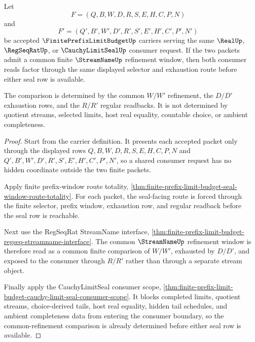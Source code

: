 \begin{theorem}
\label{thm:finite-prefix-limit-budget-common-refinement-determinacy}
Let
$$
F=(Q,B,W,D,R,S,E,H,C,P,N)
$$
and
$$
F'=(Q',B',W',D',R',S',E',H',C',P',N')
$$
be accepted $\FinitePrefixLimitBudgetUp$ carriers serving the same $\RealUp$, $\RegSeqRatUp$, or $\CauchyLimitSealUp$ consumer request. If the two packets admit a common finite $\StreamNameUp$ refinement window, then both consumer reads factor through the same displayed selector and exhaustion route before either seal row is available.

The comparison is determined by the common $W/W'$ refinement, the $D/D'$ exhaustion rows, and the $R/R'$ regular readbacks. It is not determined by quotient streams, selected limits, host real equality, countable choice, or ambient completeness.
\end{theorem}
\begin{proof}
Start from the carrier definition. It presents each accepted packet only through the displayed rows $Q,B,W,D,R,S,E,H,C,P,N$ and $Q',B',W',D',R',S',E',H',C',P',N'$, so a shared consumer request has no hidden coordinate outside the two finite packets.

Apply finite prefix-window route totality, \autoref{thm:finite-prefix-limit-budget-seal-window-route-totality}. For each packet, the seal-facing route is forced through the finite selector, prefix window, exhaustion row, and regular readback before the seal row is reachable.

Next use the RegSeqRat StreamName interface, \autoref{thm:finite-prefix-limit-budget-regseq-streamname-interface}. The common $\StreamNameUp$ refinement window is therefore read as a common finite comparison of $W/W'$, exhausted by $D/D'$, and exposed to the consumer through $R/R'$ rather than through a separate stream object.

Finally apply the CauchyLimitSeal consumer scope, \autoref{thm:finite-prefix-limit-budget-cauchy-limit-seal-consumer-scope}. It blocks completed limits, quotient streams, choice-derived tails, host real equality, hidden tail schedules, and ambient completeness data from entering the consumer boundary, so the common-refinement comparison is already determined before either seal row is available.
\end{proof}

